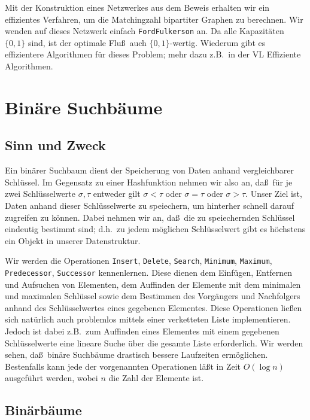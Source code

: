 \documentclass[10pt,reqno]{amsart}
\numberwithin{equation}{section}
\begin{document}
Mit der Konstruktion eines Netzwerkes aus dem Beweis erhalten wir ein effizientes Verfahren, um die Matchingzahl bipartiter Graphen zu berechnen.
Wir wenden auf dieses Netzwerk einfach {\tt FordFulkerson} an.
Da alle Kapazit\"aten $\{0,1\}$ sind, ist der optimale Flu\ss\ auch $\{0,1\}$-wertig.
Wiederum gibt es effizientere Algorithmen f\"ur dieses Problem; mehr dazu z.B.\ in der VL Effiziente Algorithmen.

\section{Bin\"are Suchb\"aume}\label{sec_binary}

\subsection{Sinn und Zweck}\label{sec_binary_purpose}
Ein bin\"arer Suchbaum dient der Speicherung von Daten anhand vergleichbarer Schl\"ussel.
Im Gegensatz zu einer Hashfunktion nehmen wir also an, da\ss\ f\"ur je zwei Schl\"usselwerte $\sigma,\tau$ entweder gilt $\sigma<\tau$ oder $\sigma=\tau$ oder $\sigma>\tau$.
Unser Ziel ist, Daten anhand dieser Schl\"usselwerte zu speiechern, um hinterher schnell darauf zugreifen zu k\"onnen.
Dabei nehmen wir an, da\ss\ die zu speiechernden Schl\"ussel eindeutig bestimmt sind; d.h.\ zu jedem m\"oglichen Schl\"usselwert gibt es h\"ochstens ein Objekt in unserer Datenstruktur.

Wir werden die Operationen {\tt Insert}, {\tt Delete}, {\tt Search}, {\tt Minimum}, {\tt Maximum}, {\tt Predecessor}, {\tt Successor} kennenlernen.
Diese dienen dem Einf\"ugen, Entfernen und Aufsuchen von Elementen, dem Auffinden der Elemente mit dem minimalen und maximalen Schl\"ussel sowie dem Bestimmen des Vorg\"angers und Nachfolgers anhand des Schl\"usselwertes eines gegebenen Elementes.
Diese Operationen lie\ss en sich nat\"urlich auch problemlos mittels einer verketteten Liste implementieren.
Jedoch ist dabei z.B.\ zum Auffinden eines Elementes mit einem gegebenen Schl\"usselwerte eine lineare Suche \"uber die gesamte Liste erforderlich.
Wir werden sehen, da\ss\ bin\"are Suchb\"aume drastisch bessere Laufzeiten erm\"oglichen.
Bestenfalls kann jede der vorgenannten Operationen l\"a\ss t in Zeit $O(\log n)$ ausgef\"uhrt werden, wobei $n$ die Zahl der Elemente ist.

\subsection{Bin\"arb\"aume}\label{sec_binary_trees}
\end{document}
